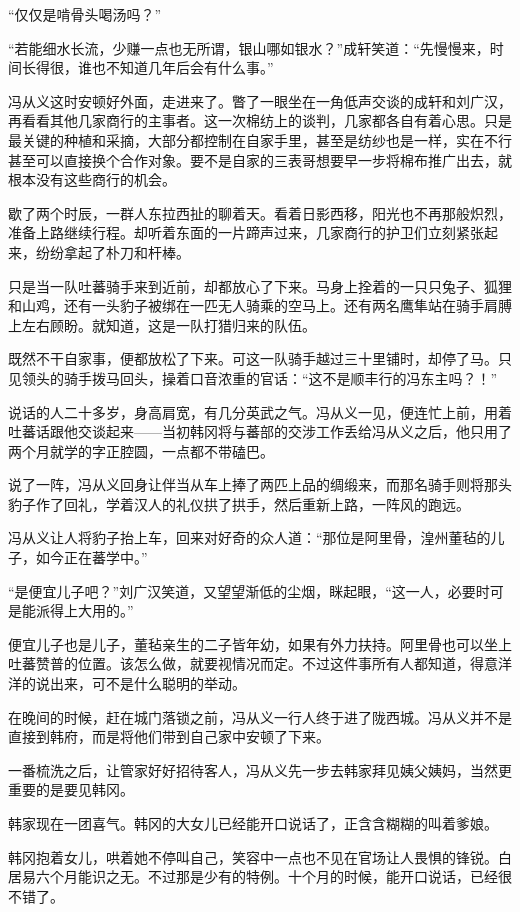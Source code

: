 “仅仅是啃骨头喝汤吗？”

“若能细水长流，少赚一点也无所谓，银山哪如银水？”成轩笑道：“先慢慢来，时间长得很，谁也不知道几年后会有什么事。”

冯从义这时安顿好外面，走进来了。瞥了一眼坐在一角低声交谈的成轩和刘广汉，再看看其他几家商行的主事者。这一次棉纺上的谈判，几家都各自有着心思。只是最关键的种植和采摘，大部分都控制在自家手里，甚至是纺纱也是一样，实在不行甚至可以直接换个合作对象。要不是自家的三表哥想要早一步将棉布推广出去，就根本没有这些商行的机会。

歇了两个时辰，一群人东拉西扯的聊着天。看着日影西移，阳光也不再那般炽烈，准备上路继续行程。却听着东面的一片蹄声过来，几家商行的护卫们立刻紧张起来，纷纷拿起了朴刀和杆棒。

只是当一队吐蕃骑手来到近前，却都放心了下来。马身上拴着的一只只兔子、狐狸和山鸡，还有一头豹子被绑在一匹无人骑乘的空马上。还有两名鹰隼站在骑手肩膊上左右顾盼。就知道，这是一队打猎归来的队伍。

既然不干自家事，便都放松了下来。可这一队骑手越过三十里铺时，却停了马。只见领头的骑手拨马回头，操着口音浓重的官话：“这不是顺丰行的冯东主吗？！”

说话的人二十多岁，身高肩宽，有几分英武之气。冯从义一见，便连忙上前，用着吐蕃话跟他交谈起来——当初韩冈将与蕃部的交涉工作丢给冯从义之后，他只用了两个月就学的字正腔圆，一点都不带磕巴。

说了一阵，冯从义回身让伴当从车上捧了两匹上品的绸缎来，而那名骑手则将那头豹子作了回礼，学着汉人的礼仪拱了拱手，然后重新上路，一阵风的跑远。

冯从义让人将豹子抬上车，回来对好奇的众人道：“那位是阿里骨，湟州董毡的儿子，如今正在蕃学中。”

“是便宜儿子吧？”刘广汉笑道，又望望渐低的尘烟，眯起眼，“这一人，必要时可是能派得上大用的。”

便宜儿子也是儿子，董毡亲生的二子皆年幼，如果有外力扶持。阿里骨也可以坐上吐蕃赞普的位置。该怎么做，就要视情况而定。不过这件事所有人都知道，得意洋洋的说出来，可不是什么聪明的举动。

在晚间的时候，赶在城门落锁之前，冯从义一行人终于进了陇西城。冯从义并不是直接到韩府，而是将他们带到自己家中安顿了下来。

一番梳洗之后，让管家好好招待客人，冯从义先一步去韩家拜见姨父姨妈，当然更重要的是要见韩冈。

韩家现在一团喜气。韩冈的大女儿已经能开口说话了，正含含糊糊的叫着爹娘。

韩冈抱着女儿，哄着她不停叫自己，笑容中一点也不见在官场让人畏惧的锋锐。白居易六个月能识之无。不过那是少有的特例。十个月的时候，能开口说话，已经很不错了。

